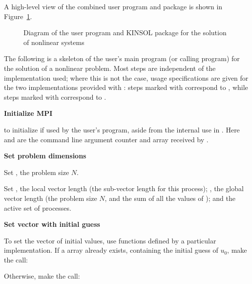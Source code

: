 A high-level view of the combined user program and {\kinsol} package is
shown in Figure~\ref{f:sim_overview}.
\begin{figure}
\centerline{}
\caption {Diagram of the user program and 
  KINSOL package for the solution of nonlinear systems}\label{f:sim_overview}
\end{figure}
The following is a skeleton of the user's main program (or calling
program) for the solution of a nonlinear problem. 
Most steps are independent of the {\nvector} implementation used; 
where this is not the case, usage specifications are given for the two implementations 
provided with {\kinsol}: steps marked with {\p} correspond to 
{\nvecp}, while steps marked with {\s} correspond to {\nvecs}.
%
\begin{Steps}
  
\item 
  {\bf Initialize MPI}

  {\p}  to initialize {\mpi} if used by
  the user's program, aside from the internal use in {\nvecp}.  
  Here  and  are the command line argument 
  counter and array received by .
  
\item
  {\bf Set problem dimensions}

  {\s} Set , the problem size $N$.

  {\p} Set , the local vector length (the sub-vector
  length for this process); , the global vector length (the
  problem size $N$, and the sum of all the values of );
  and the active set of processes.
  
\item
  {\bf Set vector with initial guess}
 
  To set the vector  of initial values, use functions defined by a
  particular {\nvector} implementation.  If a  array  
  already exists, containing the initial guess of $u_0$, make the call:

  {\s} 

  {\p} 

  Otherwise, make the call:

  {\s} 

  {\p} 


\end{Steps}
